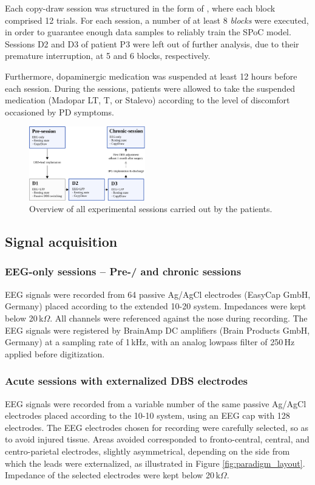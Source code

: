 \documentclass[10pt,a4paper]{article}
\begin{document}
Each copy-draw session was structured in the form of , where each block comprised 12 trials. For each session, a number of at least 8 \textit{blocks} were executed, in order to guarantee enough data samples to reliably train the SPoC model. Sessions D2 and D3 of patient P3 were left out of further analysis, due to their premature interruption, at 5 and 6 blocks, respectively.

Furthermore, dopaminergic medication was suspended at least 12 hours before each session. During the sessions, patients were allowed to take the suspended medication (Madopar LT, T, or Stalevo) according to the level of discomfort occasioned by PD symptoms.

\begin{figure}[h!]
\centering
\includegraphics[width=0.45\textwidth]{figures/all_sessions}
\caption{Overview of all experimental sessions carried out by the patients.}
\label{fig:sessions_overview}
\end{figure}

\subsection{Signal acquisition}
\subsubsection{EEG-only sessions -- Pre-/ and chronic sessions}
EEG signals were recorded from 64 passive Ag/AgCl electrodes (EasyCap GmbH, Germany) placed according to the extended 10-20 system. Impedances were kept below 20\,k$\Omega$. All channels were referenced against the nose during recording. The EEG signals were registered by BrainAmp DC amplifiers (Brain Products GmbH, Germany) at a sampling rate of 1\,kHz, with an analog lowpass filter of 250\,Hz applied before digitization.

\subsubsection{Acute sessions with externalized DBS electrodes}
EEG signals were recorded from a variable number of the same passive Ag/AgCl electrodes placed according to the 10-10 system, using an EEG cap with 128 electrodes. The EEG electrodes chosen for recording were carefully selected, so as to avoid injured tissue. Areas avoided corresponded to fronto-central, central, and centro-parietal electrodes, slightly asymmetrical, depending on the side from which the leads were externalized, as illustrated in Figure \ref{fig:paradigm_layout}. Impedance of the selected electrodes were kept below 20\,k$\Omega$.
\end{document}
